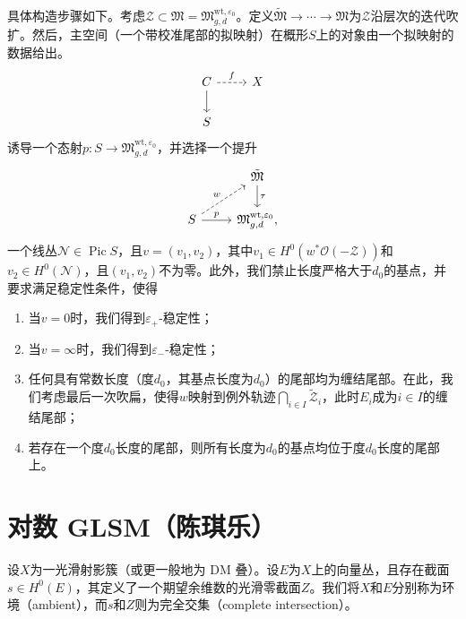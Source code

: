 \documentclass{amsart}
\theoremstyle{definition}
\theoremstyle{remark}
\theoremstyle{plain}
\theoremstyle{definition}
\theoremstyle{remark}
\newcommand{\ep}{\varepsilon}
\newcommand{\mc}[1]{\mathcal{#1}}
\newcommand{\mf}[1]{\mathfrak{#1}}
\newcommand{\mr}[1]{\mathrm{#1}}
\newcommand{\1}{\mathbf{1}}
\newcommand{\2}{\mathbf{2}}
\newcommand{\3}{\mathbf{3}}
\DeclareMathOperator{\Pic}{Pic}
\begin{document}
具体构造步骤如下。考虑\(\mc{Z} \subset \mf{M} = \mf{M}_{g,d}^{\mr{wt}, \ep_0}\)。定义\(\tilde{\mf{M}} \to \cdots \to \mf{M}\)为\(\mc{Z}\)沿层次的迭代吹扩。然后，主空间（一个带校准尾部的拟映射）在概形\(S\)上的对象由一个拟映射的数据给出。
\begin{equation*}
\begin{tikzcd}
    C \ar{d} \ar[dashrightarrow]{r}{f} & X \\
    S
\end{tikzcd}
\end{equation*}
诱导一个态射\(p \colon S \to \mf{M}_{g,d}^{\mr{wt}, \ep_0}\)，并选择一个提升
\begin{equation*}
\begin{tikzcd}
    & \tilde{\mf{M}} \ar{d}{\tau} \\
    S \ar{r}{p} \ar[dashrightarrow]{ur}{w} & \mf{M}_{g,d}^{\mr{wt}, \ep_0},
\end{tikzcd}
\end{equation*}
一个线丛\(\mc{N} \in \Pic S\)，且\(v = (v_1, v_2)\)，其中\(v_1 \in H^0(w^* \mc{O}(-\mc{Z}))\)和\(v_2 \in H^0(\mc{N})\)，且\((v_1, v_2)\)不为零。此外，我们禁止长度严格大于\(d_0\)的基点，并要求满足稳定性条件，使得
\begin{enumerate}
    \item 当\(v = 0\)时，我们得到\(\ep_+\)-稳定性；
    \item 当\(v = \infty\)时，我们得到\(\ep_-\)-稳定性；
    \item 任何具有常数长度（度\(d_0\)，其基点长度为\(d_0\)）的尾部均为缠结尾部。在此，我们考虑最后一次吹扁，使得\(w\)映射到例外轨迹\(\bigcap_{i \in I} \tilde{\mc{Z}}_i\)，此时\(E_i\)成为\(i \in I\)的缠结尾部；
    \item 若存在一个度\(d_0\)长度的尾部，则所有长度为\(d_0\)的基点均位于度\(d_0\)长度的尾部上。
\end{enumerate}







\section{对数 GLSM（陈琪乐）}%
\label{sec:Log GLSM (陈琪乐)}

设\(X\)为一光滑射影簇（或更一般地为 DM 叠）。设\(E\)为\(X\)上的向量丛，且存在截面\(s \in H^0(E)\)，其定义了一个期望余维数的光滑零截面\(Z\)。我们将\(X\)和\(E\)分别称为环境（ambient），而\(s\)和\(Z\)则为完全交集（complete intersection）。
\end{document}
